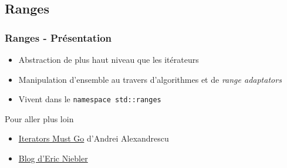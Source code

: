 \documentclass[C++.tex]{subfiles}
\begin{document}
\subsection*{Ranges}
\begin{frame}
	\frametitle{Ranges - Présentation}
	\begin{itemize}
		\item Abstraction de plus haut niveau que les itérateurs
		\item Manipulation d'ensemble au travers d'algorithmes et de \textit{range adaptators}
		\item Vivent dans le \lstinline|namespace std::ranges|

	\end{itemize}

	\begin{block}{Pour aller plus loin}
		\begin{itemize}
			\item \href{https://accu.org/content/conf2009/AndreiAlexandrescu_iterators-must-go.pdf}{\og Iterators Must Go\fg{}} d'Andrei Alexandrescu


			\item \href{http://ericniebler.com/}{Blog d'Eric Niebler}
		\end{itemize}
	\end{block}
\end{frame}
\end{document}
